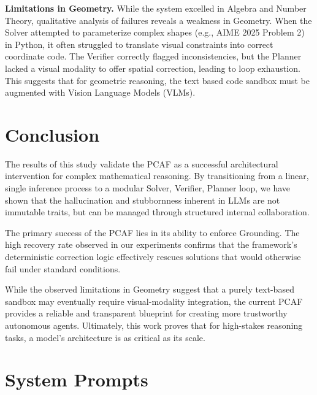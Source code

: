\documentclass{article}
\begin{document}
\textbf{Limitations in Geometry.}
While the system excelled in Algebra and Number Theory, qualitative analysis of failures reveals a weakness in Geometry. When the Solver attempted to parameterize complex shapes (e.g., AIME 2025 Problem 2) in Python, it often struggled to translate visual constraints into correct coordinate code. The Verifier correctly flagged inconsistencies, but the Planner lacked a visual modality to offer spatial correction, leading to loop exhaustion. This suggests that for geometric reasoning, the text based code sandbox must be augmented with Vision Language Models (VLMs).

\section{Conclusion}
The results of this study validate the PCAF as a successful architectural intervention for complex mathematical reasoning. By transitioning from a linear, single inference process to a modular Solver, Verifier, Planner loop, we have shown that the hallucination and stubbornness inherent in LLMs are not immutable traits, but can be managed through structured internal collaboration.

The primary success of the PCAF lies in its ability to enforce Grounding. The high recovery rate observed in our experiments confirms that the framework’s deterministic correction logic effectively rescues solutions that would otherwise fail under standard conditions.

 While the observed limitations in Geometry suggest that a purely text-based sandbox may eventually require visual-modality integration, the current PCAF provides a reliable and transparent blueprint for creating more trustworthy autonomous agents. Ultimately, this work proves that for high-stakes reasoning tasks, a model's architecture is as critical as its scale. 

\newpage


\newpage
\appendix
\renewcommand{\thesection}{Appendix \Alph{section}}
\renewcommand{\thesubsection}{\Alph{section}.\arabic{subsection}}

\section{System Prompts}
\label{app:prompts}
\end{document}
